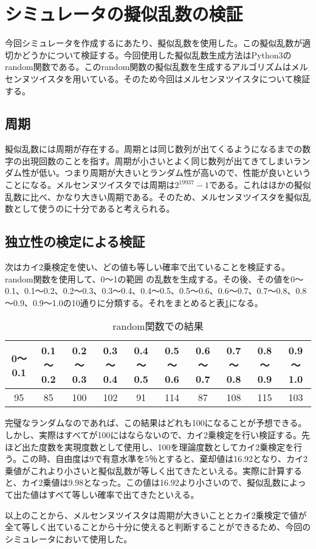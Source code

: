 \section{シミュレータの擬似乱数の検証}
今回シミュレータを作成するにあたり、擬似乱数を使用した。この擬似乱数が適切かどうかについて検証する。今回使用した擬似乱数生成方法はPython3のrandom関数である。このrandom関数の擬似乱数を生成するアルゴリズムはメルセンヌツイスタを用いている。そのため今回はメルセンヌツイスタについて検証する。
\subsection{周期}
擬似乱数には周期が存在する。周期とは同じ数列が出てくるようになるまでの数字の出現回数のことを指す。周期が小さいとよく同じ数列が出てきてしまいランダム性が低い。つまり周期が大きいとランダム性が高いので、性能が良いということになる。メルセンヌツイスタでは周期は$2^{19937}-1$である。これはほかの擬似乱数に比べ、かなり大きい周期である。そのため、メルセンヌツイスタを擬似乱数として使うのに十分であると考えられる。
\subsection{独立性の検定による検証}
次はカイ2乗検定を使い、どの値も等しい確率で出ていることを検証する。random関数を使用して、0～1の範囲
の乱数を生成する。その後、その値を0～0.1、0.1～0.2、0.2～0.3、0.3～0.4、0.4～0.5、0.5～0.6、0.6～0.7、0.7～0.8、0.8～0.9、0.9～1.0の10通りに分類する。それをまとめると表\ref{table:randomresult}になる。
\begin{table}[H]
 \caption{random関数での結果}
 \label{table:randomresult}
 \begin{center}
  \begin{tabular}{|c|c|c|c|c|c|c|c|c|c|}
    \hline    0～0.1 &  0.1～0.2 & 0.2～0.3 & 0.3～0.4 &  0.4～0.5 & 0.5～0.6 & 0.6～0.7 & 0.7～0.8 & 0.8～0.9 & 0.9～1.0 \\
    \hline 95 & 85 & 100 & 102 & 91 & 114 & 87 & 108 & 115 & 103 \\
    \hline
  \end{tabular}
 \end{center}
\end{table}
完璧なランダムなのであれば、この結果はどれも100になることが予想できる。しかし、実際はすべてが100にはならないので、カイ2乗検定を行い検証する。先ほど出た度数を実現度数として使用し、100を理論度数としてカイ2乗検定を行う。この時、自由度は9で有意水準を5％とすると、棄却値は16.92となり、カイ2乗値がこれより小さいと擬似乱数が等しく出てきたといえる。実際に計算すると、カイ2乗値は9.98となった。この値は16.92より小さいので、擬似乱数によって出た値はすべて等しい確率で出てきたといえる。

以上のことから、メルセンヌツイスタは周期が大きいこととカイ2乗検定で値が全て等しく出ていることから十分に使えると判断することができるため、今回のシミュレータにおいて使用した。
